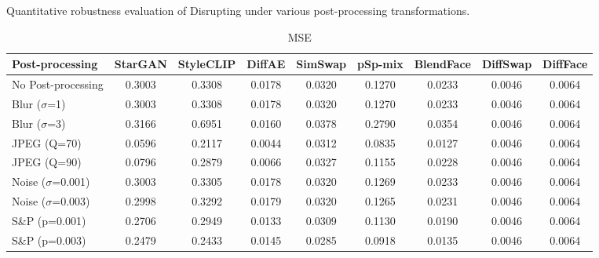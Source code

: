 \documentclass{article}
\begin{document}
\begin{table}[h!]
\caption{Quantitative robustness evaluation of Disrupting under various post-processing transformations.}
\label{tab:robust_disrupting}
\centering
\small

\begin{subtable}{\textwidth}
\caption{MSE}
\centering
\scriptsize
\begin{tabular}{lcccccccc}
\toprule
\textbf{Post-processing} & StarGAN & StyleCLIP & DiffAE & SimSwap & pSp-mix & BlendFace & DiffSwap & DiffFace \\
\midrule
No Post-processing & 0.3003 & 0.3308 & 0.0178 & 0.0320 & 0.1270 & 0.0233 & 0.0046 &0.0064\\
\midrule
Blur ($\sigma$=1) & 0.3003 & 0.3308 & 0.0178 & 0.0320 & 0.1270 & 0.0233 & 0.0046 & 0.0064 \\
Blur ($\sigma$=3) & 0.3166 & 0.6951 & 0.0160 & 0.0378 & 0.2790 & 0.0354 & 0.0046 & 0.0064 \\
JPEG (Q=70) & 0.0596 & 0.2117 & 0.0044 & 0.0312 & 0.0835 & 0.0127 & 0.0046 & 0.0064 \\
JPEG (Q=90) & 0.0796 & 0.2879 & 0.0066 & 0.0327 & 0.1155 & 0.0228 & 0.0046 & 0.0064 \\
Noise ($\sigma$=0.001) & 0.3003 & 0.3305 & 0.0178 & 0.0320 & 0.1269 & 0.0233 & 0.0046 & 0.0064 \\
Noise ($\sigma$=0.003) & 0.2998 & 0.3292 & 0.0179 & 0.0320 & 0.1265 & 0.0231 & 0.0046 & 0.0064 \\
S\&P (p=0.001) & 0.2706 & 0.2949 & 0.0133 & 0.0309 & 0.1130 & 0.0190 & 0.0046 & 0.0064 \\
S\&P (p=0.003) & 0.2479 & 0.2433 & 0.0145 & 0.0285 & 0.0918 & 0.0135 & 0.0046 & 0.0064 \\
\bottomrule
\end{tabular}
\end{subtable}


\end{table}
\end{document}
